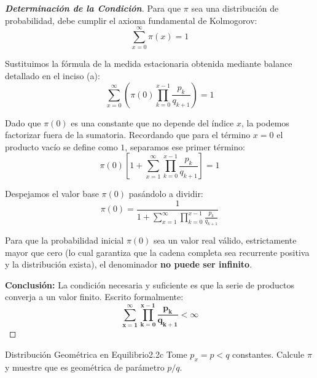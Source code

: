\documentclass[10pt,a4paper]{article}
\begin{document}
\begin{proof}[\textbf{Determinación de la Condición}]
    Para que $\pi$ sea una distribución de probabilidad, debe cumplir el axioma fundamental de Kolmogorov:
    \[ \sum_{x=0}^{\infty} \pi(x) = 1 \]

    Sustituimos la fórmula de la medida estacionaria obtenida mediante balance detallado en el inciso (a):
    \[ \sum_{x=0}^{\infty} \left( \pi(0) \prod_{k=0}^{x-1} \frac{p_k}{q_{k+1}} \right) = 1 \]

    Dado que $\pi(0)$ es una constante que no depende del índice $x$, la podemos factorizar fuera de la sumatoria. Recordando que para el término $x=0$ el producto vacío se define como $1$, separamos ese primer término:
    \[ \pi(0) \left[ 1 + \sum_{x=1}^{\infty} \prod_{k=0}^{x-1} \frac{p_k}{q_{k+1}} \right] = 1 \]

    Despejamos el valor base $\pi(0)$ pasándolo a dividir:
    \[ \pi(0) = \frac{1}{1 + \sum_{x=1}^{\infty} \prod_{k=0}^{x-1} \frac{p_k}{q_{k+1}}} \]

    Para que la probabilidad inicial $\pi(0)$ sea un valor real válido, estrictamente mayor que cero (lo cual garantiza que la cadena completa sea recurrente positiva y la distribución exista), el denominador \textbf{no puede ser infinito}. 

    \textbf{Conclusión:}
    La condición necesaria y suficiente es que la serie de productos converja a un valor finito. Escrito formalmente:
    \[ \mathbf{\sum_{x=1}^{\infty} \prod_{k=0}^{x-1} \frac{p_k}{q_{k+1}} < \infty} \]
\end{proof}


\newpage


\begin{ejercicio}{Distribución Geométrica en Equilibrio}{2.2c}
    Tome $p_x = p < q$ constantes. Calcule $\pi$ y muestre que es geométrica de parámetro $p/q$.
\end{ejercicio}

\vspace{2mm}
\end{document}
